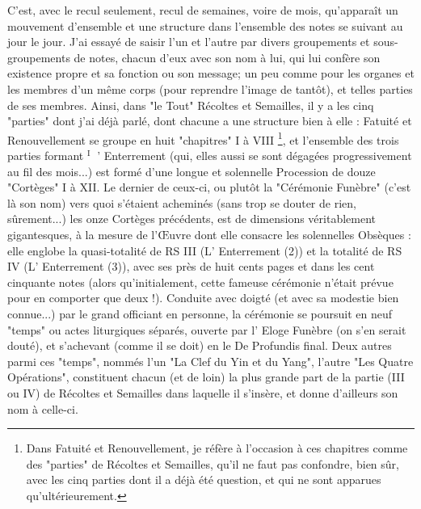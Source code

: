 C'est, avec le recul seulement, recul de semaines, voire de mois, qu'apparaît un mouvement d'ensemble et une structure dans l'ensemble des notes se suivant au jour le jour. J'ai essayé de saisir l'un et l'autre par divers groupements et sous-groupements de notes, chacun d'eux avec son nom à lui, qui lui confère son existence propre et sa fonction ou son message; un peu comme pour les organes et les membres d'un même corps (pour reprendre l'image de tantôt), et telles parties de ses membres. Ainsi, dans "le Tout" Récoltes et Semailles, il y a les cinq "parties" dont j'ai déjà parlé, dont chacune a une structure bien à elle : Fatuité et Renouvellement se groupe en huit "chapitres" I à VIII \footnote{Dans Fatuité et Renouvellement, je réfère à l'occasion à ces chapitres comme des "parties" de Récoltes et Semailles, qu'il ne faut pas confondre, bien sûr, avec les cinq parties dont il a déjà été question, et qui ne sont apparues qu'ultérieurement.}, et l'ensemble des trois parties formant ${ }^{\text {I }}$ ' Enterrement (qui, elles aussi se sont dégagées progressivement au fil des mois...) est formé d'une longue et solennelle Procession de douze "Cortèges" I à XII. Le dernier de ceux-ci, ou plutôt la "Cérémonie Funèbre" (c'est là son nom) vers quoi s'étaient acheminés (sans trop se douter de rien, sûrement...) les onze Cortèges précédents, est de dimensions véritablement gigantesques, à la mesure de l'Œuvre dont elle consacre les solennelles Obsèques : elle englobe la quasi-totalité de RS III (L' Enterrement (2)) et la totalité de RS IV (L' Enterrement (3)), avec ses près de huit cents pages et dans les cent cinquante notes (alors qu'initialement, cette fameuse cérémonie n'était prévue pour en comporter que deux !). Conduite avec doigté (et avec sa modestie bien connue...) par le grand officiant en personne, la cérémonie se poursuit en neuf "temps" ou actes liturgiques séparés, ouverte par l' Eloge Funèbre (on s'en serait douté), et s'achevant (comme il se doit) en le De Profundis final. Deux autres parmi ces "temps", nommés l'un "La Clef du Yin et du Yang", l'autre "Les Quatre Opérations", constituent chacun (et de loin) la plus grande part de la partie (III ou IV) de Récoltes et Semailles dans laquelle il s'insère, et donne d'ailleurs son nom à celle-ci.

